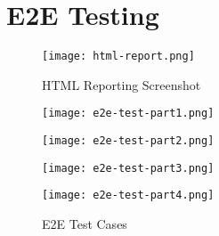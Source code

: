 \chapter{E2E Testing}
\label{appendix:e2e-testing}

\begin{figure}[!hbt]
  	\centering
 	\texttt{[image: html-report.png]}
  	\caption{HTML Reporting Screenshot}
 	\label{fig:html-reporting}
\end{figure}

\begin{figure}[!hbt]\ContinuedFloat
  	\centering
 	\texttt{[image: e2e-test-part1.png]}
\end{figure}

\begin{figure}[!hbt]\ContinuedFloat
  	\centering
	\texttt{[image: e2e-test-part2.png]}
\end{figure}

\begin{figure}[!hbt]\ContinuedFloat
  	\centering
	\texttt{[image: e2e-test-part3.png]}
\end{figure}

\begin{figure}[!hbt]
  	\centering
	\texttt{[image: e2e-test-part4.png]}
  	\caption{E2E Test Cases}
 	\label{fig:e2e-test-cases}
\end{figure}
%